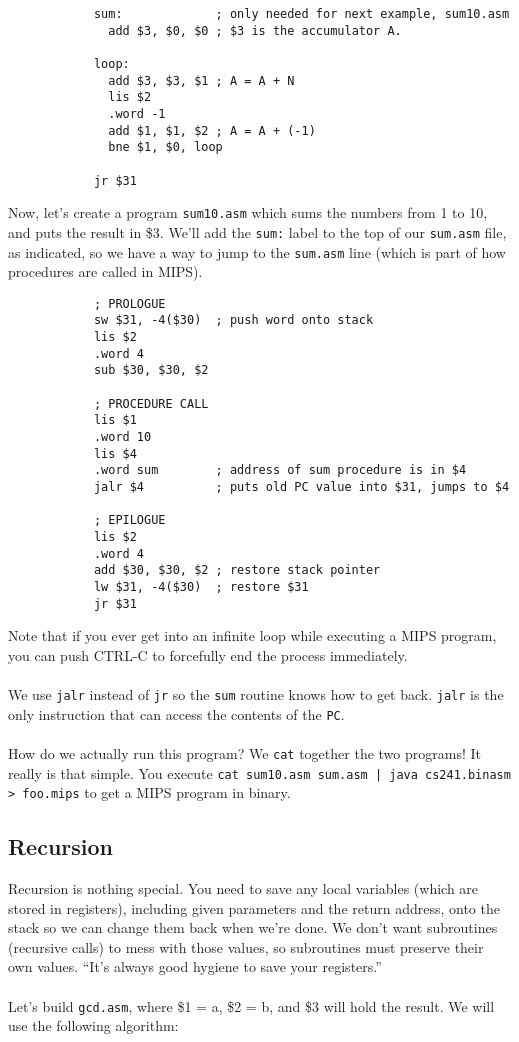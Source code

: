 \documentclass[]{article}
\theoremstyle{definition}
\begin{document}
		\begin{verbatim}
			sum:             ; only needed for next example, sum10.asm
			  add $3, $0, $0 ; $3 is the accumulator A.

			loop:
			  add $3, $3, $1 ; A = A + N
			  lis $2
			  .word -1
			  add $1, $1, $2 ; A = A + (-1)
			  bne $1, $0, loop

			jr $31
		\end{verbatim}

		Now, let's create a program \verb+sum10.asm+ which sums the numbers from 1 to 10, and puts the result in \$3. We'll add the \verb+sum:+ label to the top of our \verb+sum.asm+ file, as indicated, so we have a way to jump to the \verb+sum.asm+ line (which is part of how procedures are called in MIPS).
		
		\begin{verbatim}
			; PROLOGUE
			sw $31, -4($30)  ; push word onto stack
			lis $2
			.word 4
			sub $30, $30, $2
			
			; PROCEDURE CALL
			lis $1
			.word 10
			lis $4
			.word sum        ; address of sum procedure is in $4
			jalr $4          ; puts old PC value into $31, jumps to $4

			; EPILOGUE
			lis $2
			.word 4
			add $30, $30, $2 ; restore stack pointer 
			lw $31, -4($30)  ; restore $31
			jr $31
		\end{verbatim}

		Note that if you ever get into an infinite loop while executing a MIPS program, you can push CTRL-C to forcefully end the process immediately.
		\\ \\
		We use \verb+jalr+ instead of \verb+jr+ so the \verb+sum+ routine knows how to get back. \verb+jalr+ is the only instruction that can access the contents of the \verb+PC+.
		\\ \\
		How do we actually run this program? We \verb+cat+ together the two programs! It really is that simple. You execute \verb+cat sum10.asm sum.asm | java cs241.binasm > foo.mips+ to get a MIPS program in binary.

		\subsection{Recursion}
			Recursion is nothing special. You need to save any local variables (which are stored in registers), including given parameters and the return address, onto the stack so we can change them back when we're done. We don't want subroutines (recursive calls) to mess with those values, so subroutines must preserve their own values. ``It's always good hygiene to save your registers.''
			\\ \\
			Let's build \verb+gcd.asm+, where \$1 = a, \$2 = b, and \$3 will hold the result. We will use the following algorithm:
\end{document}
